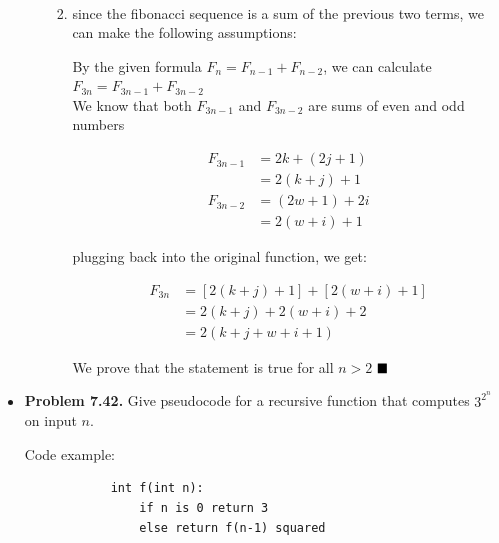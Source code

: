 \documentclass{article}
\begin{document}
\begin{itemize}
\begin{enumerate}[label=(d)]
\begin{enumerate}[label=(\roman*)]
\begin{align*}
                \end{align*}
                \item since the fibonacci sequence is a sum of the previous two terms, we can make the following assumptions:
                \begin{center}
                    By the given formula $F_n = F_{n-1} + F_{n-2}$, we can calculate $F_{3n} = F_{3n-1} + F_{3n-2}$\\
                    We know that both $F_{3n-1}$ and $F_{3n-2}$ are sums of even and odd numbers
                \end{center}
                \begin{align*}
                    F_{3n-1} &= 2k + (2j + 1)\\
                             &= 2(k + j) + 1\\
                    F_{3n-2} &= (2w + 1) + 2i\\
                             &= 2(w + i) + 1
                \end{align*}
                \begin{center}
                    plugging back into the original function, we get:
                \end{center}
                \begin{align*}
                    F_{3n} &= [2(k+j) + 1] + [2(w+i) + 1]\\
                           &= 2(k + j) + 2(w+i) + 2\\
                           &= 2(k + j + w + i + 1)
                \end{align*}
                \begin{center}
                    We prove that the statement is true for all $n > 2$ $\hfill\blacksquare$
                \end{center}
            \end{enumerate}
        \end{enumerate}
        \item \textbf{Problem 7.42.} Give pseudocode for a recursive function that computes $3^{2^n}$ on input $n$.
        \begin{center}
            Code example:
        \end{center}
        \begin{verbatim}
            int f(int n):
                if n is 0 return 3
                else return f(n-1) squared
        \end{verbatim}
        \begin{center}

\end{center}
\end{itemize}
\end{document}
